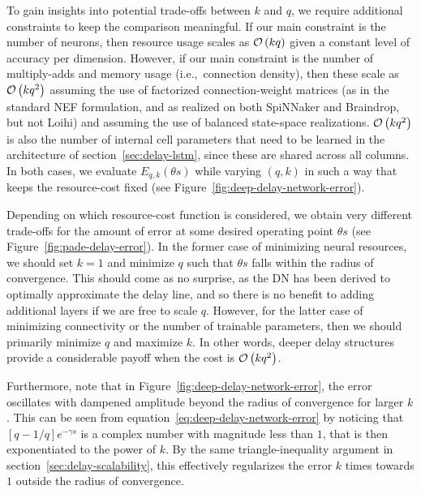 
To gain insights into potential trade-offs between $k$ and $q$, we require additional constraints to keep the comparison meaningful.
If our main constraint is the number of neurons, then resource usage scales as $\mathcal{O}\left({k q}\right)$ given a constant level of accuracy per dimension.
However, if our main constraint is the number of multiply-adds and memory usage (i.e.,~connection density), then these scale as $\mathcal{O}\left({k q^2}\right)$ assuming the use of factorized connection-weight matrices (as in the standard NEF formulation, and as realized on both SpiNNaker and Braindrop, but not Loihi) and assuming the use of balanced state-space realizations.
$\mathcal{O}\left({k q^2}\right)$ is also the number of internal cell parameters that need to be learned in the architecture of section~\ref{sec:delay-lstm}, since these are shared across all columns.
In both cases, we evaluate $E_{q,k}(\theta s)$ while varying $(q, k)$ in such a way that keeps the resource-cost fixed (see Figure~\ref{fig:deep-delay-network-error}).

Depending on which resource-cost function is considered, we obtain very different trade-offs for the amount of error at some desired operating point $\theta s$ (see Figure~\ref{fig:pade-delay-error}).
In the former case of minimizing neural resources, we should set $k = 1$ and minimize $q$ such that $\theta s$ falls within the radius of convergence.
This should come as no surprise, as the DN has been derived to optimally approximate the delay line, and so there is no benefit to adding additional layers if we are free to scale $q$.
However, for the latter case of minimizing connectivity or the number of trainable parameters, then we should primarily minimize $q$ and maximize $k$.
In other words, deeper delay structures provide a considerable payoff when the cost is $\mathcal{O}\left({kq^2}\right)$.

Furthermore, note that in Figure~\ref{fig:deep-delay-network-error}, the error oscillates with dampened amplitude beyond the radius of convergence for larger $k$.
This can be seen from equation~\ref{eq:deep-delay-network-error} by noticing that $[q-1/q]e^{-\gamma s}$ is a complex number with magnitude less than $1$, that is then exponentiated to the power of $k$.
By the same triangle-inequality argument in section~\ref{sec:delay-scalability}, this effectively regularizes the error $k$ times towards $1$ outside the radius of convergence.

